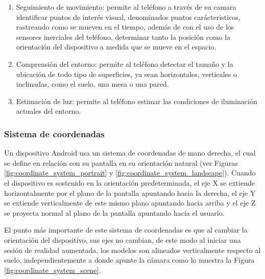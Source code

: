         \begin{enumerate}

            \item Seguimiento de movimiento: permite al teléfono a través de su camara identificar puntos de interés visual, denominados puntos carácteristicos, rastreando como se mueven en el tiempo, además de con el uso de los sensores inerciales del teléfono, determinar tanto la posición como la orientación del dispositivo a medida que se mueve en el espacio. 
            
            \item Comprensión del entorno: permite al teléfono detectar el tamaño y la ubicación de todo tipo de superficies, ya sean horizontales, verticales o inclinadas, como el suelo, una mesa o una pared.

            \item Estimación de luz: permite al teléfono estimar las condiciones de iluminación actuales del entorno.

        \end{enumerate}

        \subsubsection{Sistema de coordenadas}

            Un dispositivo Android usa un sistema de coordenadas de mano derecha, el cual se define en relación con su pantalla en su orientación natural (ver Figuras \ref{fig:coordinate_system_portrait} y \ref{fig:coordinate_system_landscape}). Cuando el dispositivo es sostenido en la orientación predeterminada, el eje X se extiende horizontalmente por el plano de la pantalla apuntando hacia la derecha, el eje Y se extiende verticalmente de este mismo plano apuntando hacia arriba y el eje Z se proyecta normal al plano de la pantalla apuntando hacia el usuario.

            
            
            
            
            El punto más importante de este sistema de coordenadas es que al cambiar la orientación del dispositivo, sus ejes no cambian, de este modo al iniciar una sesión de realidad aumentada, los modelos son alineados verticalmente respecto al suelo, independientemente a donde apunte la cámara como lo muestra la Figura \ref{fig:coordinate_system_scene}.

